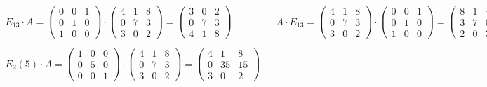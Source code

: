 \begin{figure}[h!]
\[
	\begin{array}{ccc}
		E_{13} \cdot A =
		\begin{pmatrix}
			0 & 0 & 1 \\
			0 & 1 & 0 \\
			1 & 0 & 0
		\end{pmatrix}
		\cdot
		\begin{pmatrix}
			4 & 1 & 8 \\
			0 & 7 & 3 \\
			3 & 0 & 2
		\end{pmatrix}
		=
		\begin{pmatrix}
			3 & 0 & 2 \\
			0 & 7 & 3 \\
			4 & 1 & 8
		\end{pmatrix}

		&&

		A \cdot E_{13} =
		\begin{pmatrix}
			4 & 1 & 8 \\
			0 & 7 & 3 \\
			3 & 0 & 2
		\end{pmatrix}
		\cdot
		\begin{pmatrix}
			0 & 0 & 1 \\
			0 & 1 & 0 \\
			1 & 0 & 0
		\end{pmatrix}
		=
		\begin{pmatrix}
			8 & 1 & 4 \\
			3 & 7 & 0 \\
			2 & 0 & 3
		\end{pmatrix}

		\\&&\\

		E_{2}(5) \cdot A =
		\begin{pmatrix}
			1 & 0 & 0 \\
			0 & 5 & 0 \\
			0 & 0 & 1
		\end{pmatrix}
		\cdot
		\begin{pmatrix}
			4 & 1 & 8 \\
			0 & 7 & 3 \\
			3 & 0 & 2
		\end{pmatrix}
		=
		\begin{pmatrix}
			4 & 1  & 8  \\
			0 & 35 & 15 \\
			3 & 0  & 2
		\end{pmatrix}


\end{array}\]
\end{figure}

